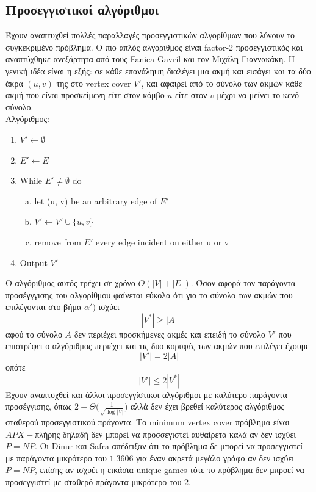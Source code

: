 \subsection{Προσεγγιστικοί αλγόριθμοι} 

Έχουν αναπτυχθεί πολλές παραλλαγές προσεγγιστικών αλγορίθμων που λύνουν το συγκεκριμένο πρόβλημα. Ο πιο απλός αλγόριθμος είναι factor-2  προσεγγιστικός και αναπτύχθηκε ανεξάρτητα από τους Fanica Gavril και τον Μιχάλη Γιαννακάκη. Η γενική ιδέα είναι η εξής: σε κάθε επανάληψη διαλέγει μια ακμή και εισάγει και τα δύο άκρα $(u, v)$ της στο vertex cover $V'$, και αφαιρεί από το σύνολο των ακμών κάθε ακμή που είναι προσκείμενη είτε στον κόμβο $u$ είτε στον $v$ μέχρι να μείνει το κενό σύνολο.\\
Αλγόριθμος:
\begin{enumerate}
\item $ V' \leftarrow \emptyset $
\item $ E' \leftarrow E$
\item While $ E' \neq {\emptyset} $ do
\begin{enumerate}[a)]
\item let (u, v) be an arbitrary edge of $E'$
\item $V' \leftarrow V' \cup \{u,v\}$
\item remove from $E'$ every edge incident on either u or v 
\end{enumerate}
\item Output $V'$
\end{enumerate}

Ο αλγόριθμος αυτός τρέχει σε χρόνο $O(|V| + |E|)$. Όσον αφορά τον παράγοντα προσέγγγισης του αλγορίθμου φαίνεται εύκολα ότι για το σύνολο των ακμών που επιλέγονται στο βήμα $\alpha')$ ισχύει $$|V^{*}| \geq |A|$$ αφού το σύνολο $Α$ δεν περιέχει προσκήμενες ακμές και επειδή το σύνολο $V'$ που επιστρέφει ο αλγόριθμος περιέχει και τις δυο κορυφές των ακμών που επιλέγει έχουμε $$|V'| = 2|A|$$ οπότε $$|V'| \leq 2|V^{*}|$$ 
Έχουν αναπτυχθεί και άλλοι προσεγγίστικοι αλγόριθμοι με καλύτερο παράγοντα προσέγγισης, όπως $2-\Theta\Big(\frac{1}{\sqrt{\log{|V|}}}\Big)$ αλλά δεν έχει βρεθεί καλύτερος αλγόριθμος σταθερού προσεγγιστικού πράγοντα. Το minimum vertex cover πρόβλημα είναι $APX-$πλήρης δηλαδή δεν μπορεί να προσσεγιστεί αυθαίρετα καλά αν δεν ισχύει $P=NP$. Οι Dinur και Safra απέδειξαν ότι το πρόβλημα δε μπορεί να προσεγγιστεί με παράγοντα μικρότερο του $1.3606$ για έναν ακρετά μεγάλο γράφο αν δεν ισχύει $P=NP$, επίσης αν ισχυέι η εικάσια unique games τότε το πρόβλημα δεν μπροεί να προσεγγιστεί με σταθερό πράγοντα μικρότερο του $2$.